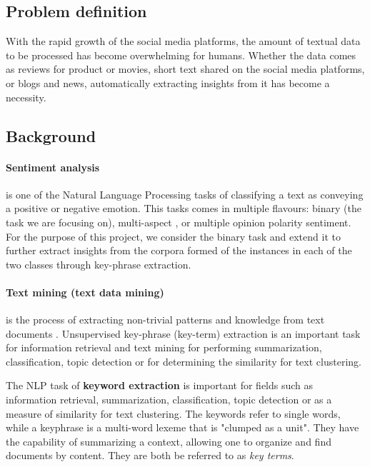 \subsection{Problem definition}
With the rapid growth of the social media platforms, the amount of textual data to be processed has become overwhelming for humans. Whether the data comes as reviews for product or movies, short text shared on the social media platforms, or blogs and news, automatically extracting insights from it has become a necessity.


\subsection{Background}

\paragraph{Sentiment analysis} is one of the Natural Language Processing tasks of classifying a text as conveying a positive or negative emotion. This tasks comes in multiple flavours: binary (the task we are focusing on), multi-aspect \cite{multiaspect}, or multiple opinion polarity sentiment. For the purpose of this project, we consider the binary task and extend it to further extract insights from the corpora formed of the instances in each of the two classes through key-phrase extraction.


\paragraph{Text mining (text data mining)} is the process of extracting non-trivial patterns and knowledge from text documents \cite{stateofartchallenge}.
Unsupervised key-phrase (key-term) extraction is an important task for information retrieval and text mining for performing summarization, classification, topic detection or for determining the similarity for text clustering. 

The NLP task of \textbf{keyword extraction} is important for fields such as information retrieval, summarization, classification, topic detection or as a measure of similarity for text clustering. 
The keywords refer to single words, while a keyphrase is a multi-word lexeme that is "clumped as a unit"\cite{manningshutze}. They have the capability of summarizing a context, allowing one to organize and find documents by content. They are both be referred to as \textit{key terms}.

